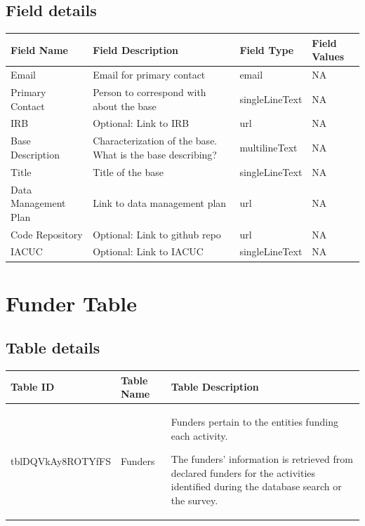 \documentclass[
]{book}
\begin{document}
\hypertarget{field-details}{%
\subsection{Field details}\label{field-details}}

\begin{table}
\centering
\begin{tabular}{l|l|l|l}
\hline
\textbf{Field Name} & \textbf{Field Description} & \textbf{Field Type} & \textbf{Field Values}\\
\hline
Email & Email for primary contact & email & NA\\
\hline
Primary Contact & Person to correspond with about the base & singleLineText & NA\\
\hline
IRB & Optional: Link to IRB & url & NA\\
\hline
Base Description & Characterization of the base. What is the base describing? & multilineText & NA\\
\hline
Title & Title of the base & singleLineText & NA\\
\hline
Data Management Plan & Link to data management plan & url & NA\\
\hline
Code Repository & Optional: Link to github repo & url & NA\\
\hline
IACUC & Optional: Link to IACUC & singleLineText & NA\\
\hline
\end{tabular}
\end{table}

\hypertarget{funders-table}{%
\section{Funder Table}\label{funders-table}}

\hypertarget{table-details-4}{%
\subsection{Table details}\label{table-details-4}}

\begin{table}
\centering
\begin{tabular}{l|l|l}
\hline
\textbf{Table ID} & \textbf{Table Name} & \textbf{Table Description}\\
\hline
tblDQVkAy8ROTYfFS & Funders & Funders pertain to the entities funding each activity.

The funders' information is retrieved from declared funders for the activities identified during the database search or the survey.\\
\hline
\end{tabular}
\end{table}
\end{document}
